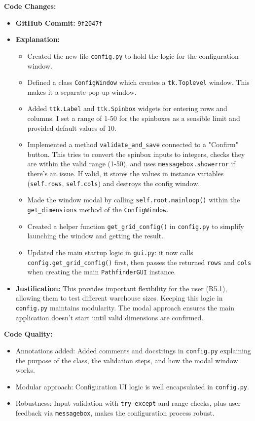 \textbf{Code Changes:}
\begin{itemize}
	\item \textbf{GitHub Commit:} \verb|9f2047f|
	\item \textbf{Explanation:}
	\begin{itemize}
		\item Created the new file \verb|config.py| to hold the logic for the configuration window.
		\item Defined a class \verb|ConfigWindow| which creates a \verb|tk.Toplevel| window. This makes it a separate pop-up window.
		\item Added \verb|ttk.Label| and \verb|ttk.Spinbox| widgets for entering rows and columns. I set a range of 1-50 for the spinboxes as a sensible limit and provided default values of 10.
		\item Implemented a method \verb|validate_and_save| connected to a "Confirm" button. This tries to convert the spinbox inputs to integers, checks they are within the valid range (1-50), and uses \verb|messagebox.showerror| if there's an issue. If valid, it stores the values in instance variables (\verb|self.rows|, \verb|self.cols|) and destroys the config window.
		\item Made the window modal by calling \verb|self.root.mainloop()| within the \verb|get_dimensions| method of the \verb|ConfigWindow|.
		\item Created a helper function \verb|get_grid_config()| in \verb|config.py| to simplify launching the window and getting the result.
		\item Updated the main startup logic in \verb|gui.py|: it now calls \verb|config.get_grid_config()| first, then passes the returned \verb|rows| and \verb|cols| when creating the main \verb|PathfinderGUI| instance.
	\end{itemize}
	\item \textbf{Justification:} This provides important flexibility for the user (R5.1), allowing them to test different warehouse sizes. Keeping this logic in \verb|config.py| maintains modularity. The modal approach ensures the main application doesn't start until valid dimensions are confirmed.
\end{itemize}

\textbf{Code Quality:}
\begin{itemize}
	\item Annotations added: Added comments and docstrings in \verb|config.py| explaining the purpose of the class, the validation steps, and how the modal window works.
	\item Modular approach: Configuration UI logic is well encapsulated in \verb|config.py|.
	\item Robustness: Input validation with \verb|try-except| and range checks, plus user feedback via \verb|messagebox|, makes the configuration process robust.
\end{itemize}

